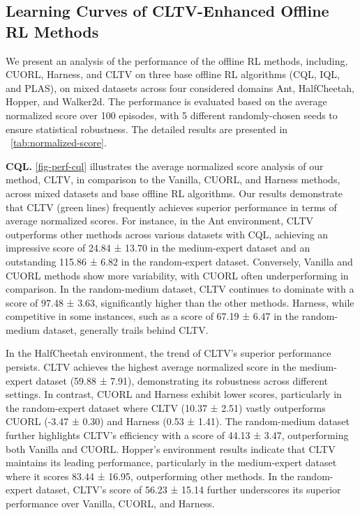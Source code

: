 \subsection{Learning Curves of CLTV-Enhanced Offline RL Methods}
\label{sec-perf-plots}
We present an analysis of the performance of the offline RL methods, including, CUORL, Harness, and CLTV on three base offline RL algorithms (CQL, IQL, and PLAS), on mixed datasets across four considered domains Ant, HalfCheetah, Hopper, and Walker2d. The performance is evaluated based on the average normalized score over 100 episodes, with 5 different randomly-chosen seeds to ensure statistical robustness. The detailed results are presented in ~\autoref{tab:normalized-score}.


\textbf{CQL.} \autoref{fig-perf-cql} illustrates the average normalized score analysis of our method, CLTV, in comparison to the Vanilla, CUORL, and Harness methods, across mixed datasets and base offline RL algorithms. Our results demonstrate that CLTV (green lines) frequently achieves superior performance in terms of average normalized scores. For instance, in the Ant environment, CLTV outperforms other methods across various datasets with CQL, achieving an impressive score of 24.84 ± 13.70 in the medium-expert dataset and an outstanding 115.86 ± 6.82 in the random-expert dataset. Conversely, Vanilla and CUORL methods show more variability, with CUORL often underperforming in comparison. In the random-medium dataset, CLTV continues to dominate with a score of 97.48 ± 3.63, significantly higher than the other methods. Harness, while competitive in some instances, such as a score of 67.19 ± 6.47 in the random-medium dataset, generally trails behind CLTV.

In the HalfCheetah environment, the trend of CLTV’s superior performance persists. CLTV achieves the highest average normalized score in the medium-expert dataset (59.88 ± 7.91), demonstrating its robustness across different settings. In contrast, CUORL and Harness exhibit lower scores, particularly in the random-expert dataset where CLTV (10.37 ± 2.51) vastly outperforms CUORL (-3.47 ± 0.30) and Harness (0.53 ± 1.41). The random-medium dataset further highlights CLTV’s efficiency with a score of 44.13 ± 3.47, outperforming both Vanilla and CUORL. Hopper’s environment results indicate that CLTV maintains its leading performance, particularly in the medium-expert dataset where it scores 83.44 ± 16.95, outperforming other methods. In the random-expert dataset, CLTV’s score of 56.23 ± 15.14 further underscores its superior performance over Vanilla, CUORL, and Harness.

